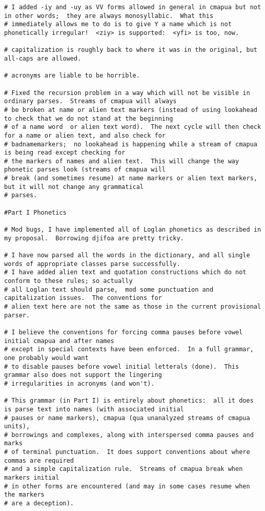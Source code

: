 \documentclass[12pt]{book}
\begin{document}
{\begin{verbatim}
# I added -iy and -uy as VV forms allowed in general in cmapua but not in other words;  they are always monosyllabic.  What this
# immediately allows me to do is to give Y a name which is not phonetically irregular!  <ziy> is supported:  <yfi> is too, now.

# capitalization is roughly back to where it was in the original, but all-caps are allowed.

# acronyms are liable to be horrible.

# Fixed the recursion problem in a way which will not be visible in ordinary parses.  Streams of cmapua will always
# be broken at name or alien text markers (instead of using lookahead to check that we do not stand at the beginning
# of a name word  or alien text word).  The next cycle will then check for a name or alien text, and also check for
# badnamemarkers;  no lookahead is happening while a stream of cmapua is being read except checking for
# the markers of names and alien text.  This will change the way phonetic parses look (streams of cmapua will
# break (and sometimes resume) at name markers or alien text markers, but it will not change any grammatical
# parses.

#Part I Phonetics

# Mod bugs, I have implemented all of Loglan phonetics as described in my proposal.  Borrowing djifoa are pretty tricky.

# I have now parsed all the words in the dictionary, and all single words of appropriate classes parse successfully.
# I have added alien text and quotation constructions which do not conform to these rules; so actually
# all Loglan text should parse,  mod some punctuation and capitalization issues.  The conventions for
# alien text here are not the same as those in the current provisional parser.

# I believe the conventions for forcing comma pauses before vowel initial cmapua and after names
# except in special contexts have been enforced.  In a full grammar, one probably would want
# to disable pauses before vowel initial letterals (done).  This grammar also does not support the lingering
# irregularities in acronyms (and won't).

# This grammar (in Part I) is entirely about phonetics:  all it does is parse text into names (with associated initial
# pauses or name markers), cmapua (qua unanalyzed streams of cmapua units), 
# borrowings and complexes, along with interspersed comma pauses and marks
# of terminal punctuation.  It does support conventions about where commas are required
# and a simple capitalization rule.  Streams of cmapua break when markers initial
# in other forms are encountered (and may in some cases resume when the markers
# are a deception).


\end{verbatim}}
\end{document}
